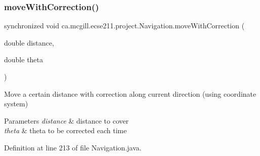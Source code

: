 \subsubsection{\texorpdfstring{move\+With\+Correction()}{moveWithCorrection()}}
{\footnotesize\ttfamily synchronized void ca.\+mcgill.\+ecse211.\+project.\+Navigation.\+move\+With\+Correction (\begin{DoxyParamCaption}\item[{double}]{distance,  }\item[{double}]{theta }\end{DoxyParamCaption})}

Move a certain distance with correction along current direction (using coordinate system)


\begin{DoxyParams}{Parameters}
{\em distance} & distance to cover \\
\hline
{\em theta} & theta to be corrected each time \\
\hline
\end{DoxyParams}


Definition at line 213 of file Navigation.\+java.



